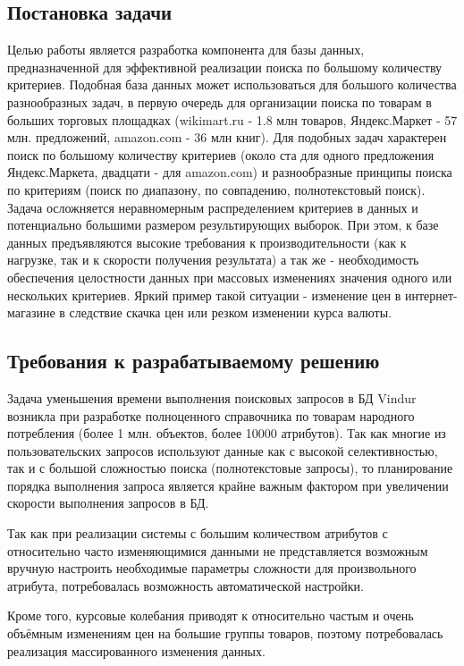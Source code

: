 \documentclass{matmex-diploma}
\begin{document}
    \subsection{Постановка задачи}
        Целью работы является разработка компонента для базы данных, предназначенной для эффективной реализации поиска по большому количеству критериев. Подобная база данных может использоваться для большого количества разнообразных задач, в первую очередь для организации поиска по товарам в больших торговых площадках (wikimart.ru - 1.8 млн товаров, Яндекс.Маркет - 57 млн. предложений, amazon.com - 36 млн книг). Для подобных задач характерен поиск по большому количеству критериев (около ста для одного предложения Яндекс.Маркета, двадцати - для amazon.com) и разнообразные принципы поиска по критериям (поиск по диапазону, по совпадению, полнотекстовый поиск). Задача осложняется неравномерным распределением критериев в данных и потенциально большими размером результирующих выборок. При этом, к базе данных предъявляются высокие требования к производительности (как к нагрузке, так и к скорости получения результата) а так же - необходимость обеспечения целостности данных при массовых изменениях значения одного или нескольких критериев. Яркий пример такой ситуации - изменение цен в интернет-магазине в следствие скачка цен или резком изменении курса валюты.
    \subsection{Требования к разрабатываемому решению}
        Задача уменьшения времени выполнения поисковых запросов в БД Vindur возникла при разработке полноценного справочника по товарам народного потребления (более 1 млн. объектов, более 10000 атрибутов). Так как многие из пользовательских запросов используют данные как с высокой селективностью, так и с большой сложностью поиска (полнотекстовые запросы), то планирование порядка выполнения запроса является крайне важным фактором при увеличении скорости выполнения запросов в БД. 

        Так как при реализации системы с большим количеством атрибутов с относительно часто изменяющимися данными не представляется возможным вручную настроить необходимые параметры сложности для произвольного атрибута, потребовалась возможность автоматической настройки.
        
        Кроме того, курсовые колебания приводят к относительно частым и очень объёмным изменениям цен на большие группы товаров, поэтому потребовалась реализация массированного изменения данных.
\end{document}
